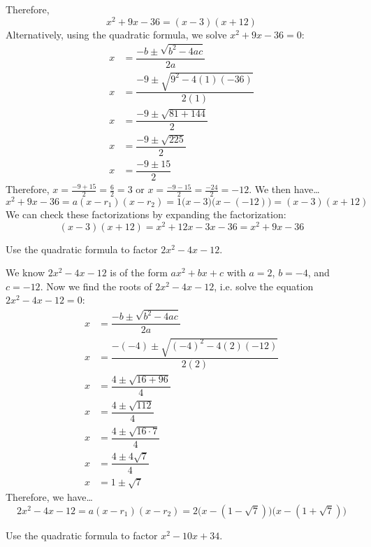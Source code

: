 \documentclass[11pt,letterpaper]{article}
\begin{document}
Therefore,
	\[
	x^2 + 9x - 36= (x - 3)(x + 12)
	\]  \pspace
Alternatively, using the quadratic formula, we solve $x^2 + 9x - 36= 0$: \pspace
	\[
	\begin{aligned}
	x&= \dfrac{-b \pm \sqrt{b^2 - 4ac}}{2a} \\[0.3cm]
	x&= \dfrac{-9 \pm \sqrt{9^2 - 4(1)(-36)}}{2(1)} \\[0.3cm]
	x&= \dfrac{-9 \pm \sqrt{81 + 144}}{2} \\[0.3cm]
	x&= \dfrac{-9 \pm \sqrt{225}}{2} \\[0.3cm]
	x&= \dfrac{-9 \pm 15}{2}
	\end{aligned}
	\] \pspace
Therefore, $x= \frac{-9 + 15}{2}= \frac{6}{2}= 3$ or $x= \frac{-9 - 15}{2}= \frac{-24}{2}= -12$. We then have\dots \pspace
	\[
	x^2 + 9x - 36= a(x - r_1)(x - r_2)= 1\big(x - 3 \big) \big(x - (-12) \big)= (x - 3)(x + 12)
	\] \pspace
We can check these factorizations by expanding the factorization: \pspace
	\[
	(x - 3)(x + 12)= x^2 + 12x - 3x - 36= x^2 + 9x - 36
	\]



\newpage



 Use the quadratic formula to factor $2x^2 - 4x - 12$. \pspace

\sol We know $2x^2 - 4x - 12$ is of the form $ax^2 + bx + c$ with $a= 2$, $b= - 4$, and $c= -12$. Now we find the roots of $2x^2 - 4x - 12$, i.e. solve the equation $2x^2 - 4x - 12= 0$: \pspace
	\[
	\begin{aligned}
	x&= \dfrac{-b \pm \sqrt{b^2 - 4ac}}{2a} \\[0.3cm]
	x&= \dfrac{-(-4) \pm \sqrt{(-4)^2 - 4(2)(-12)}}{2(2)} \\[0.3cm]
	x&= \dfrac{4 \pm \sqrt{16 + 96}}{4} \\[0.3cm]
	x&= \dfrac{4 \pm \sqrt{112}}{4} \\[0.3cm]
	x&= \dfrac{4 \pm \sqrt{16 \cdot 7}}{4} \\[0.3cm]
	x&= \dfrac{4 \pm 4\sqrt{7}}{4} \\[0.3cm]
	x&= 1 \pm \sqrt{7}
	\end{aligned}
	\] \pspace
Therefore, we have\dots \pspace
	\[
	2x^2 - 4x - 12= a(x - r_1)(x - r_2)= 2 \big(x - (1 - \sqrt{7}) \big) \big(x - (1 + \sqrt{7}) \big)
	\]



\newpage



 Use the quadratic formula to factor $x^2 - 10x + 34$. \pspace
\end{document}

